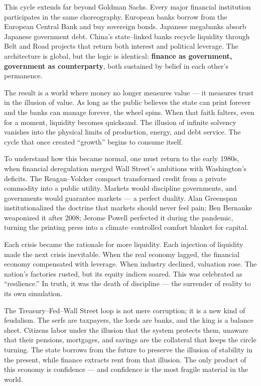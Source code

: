 \documentclass[11pt,twoside]{book}
\begin{document}
This cycle extends far beyond Goldman Sachs.  
Every major financial institution participates in the same choreography.  
European banks borrow from the European Central Bank and buy sovereign bonds.  
Japanese megabanks absorb Japanese government debt.  
China’s state–linked banks recycle liquidity through Belt and Road projects that return both interest and political leverage.  
The architecture is global, but the logic is identical: \textbf{finance as government, government as counterparty}, both sustained by belief in each other’s permanence.

The result is a world where money no longer measures value — it measures trust in the illusion of value.  
As long as the public believes the state can print forever and the banks can manage forever, the wheel spins.  
When that faith falters, even for a moment, liquidity becomes quicksand.  
The illusion of infinite solvency vanishes into the physical limits of production, energy, and debt service.  
The cycle that once created “growth” begins to consume itself.

To understand how this became normal, one must return to the early 1980s, when financial deregulation merged Wall Street’s ambitions with Washington’s deficits.  
The Reagan–Volcker compact transformed credit from a private commodity into a public utility.  
Markets would discipline governments, and governments would guarantee markets — a perfect duality.  
Alan Greenspan institutionalized the doctrine that markets should never feel pain; Ben Bernanke weaponized it after 2008; Jerome Powell perfected it during the pandemic, turning the printing press into a climate–controlled comfort blanket for capital.

Each crisis became the rationale for more liquidity.  
Each injection of liquidity made the next crisis inevitable.  
When the real economy lagged, the financial economy compensated with leverage.  
When industry declined, valuation rose.  
The nation’s factories rusted, but its equity indices soared.  
This was celebrated as “resilience.”  
In truth, it was the death of discipline — the surrender of reality to its own simulation.

The Treasury–Fed–Wall Street loop is not mere corruption; it is a new kind of feudalism.  
The serfs are taxpayers, the lords are banks, and the king is a balance sheet.  
Citizens labor under the illusion that the system protects them, unaware that their pensions, mortgages, and savings are the collateral that keeps the circle turning.  
The state borrows from the future to preserve the illusion of stability in the present, while finance extracts rent from that illusion.  
The only product of this economy is confidence — and confidence is the most fragile material in the world.
\end{document}
